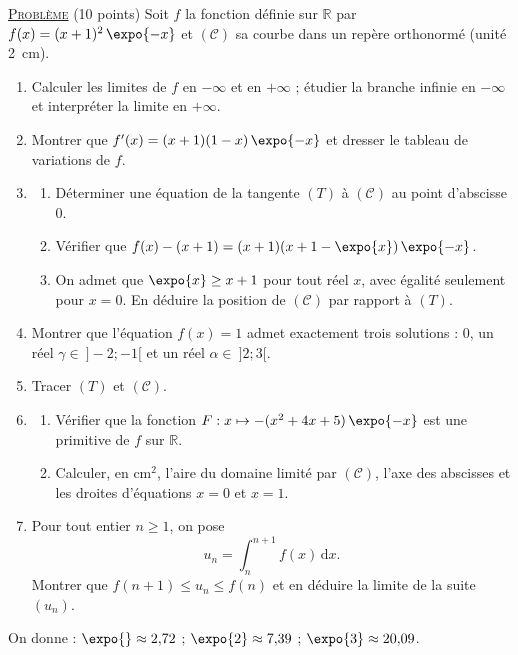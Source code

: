 \noindent \underline{\textsc{Probl\`eme}} (10 points) \newline
Soit $f$ la fonction d\'efinie sur $\mathbb{R}$ par $f(x) = (x+1)^2\,\expo{-x}$ et $(\mathscr{C})$ sa courbe
dans un rep\`ere orthonorm\'e (unit\'e 2~cm).
\begin{enumerate}
      \item Calculer les limites de $f$ en $-\infty$ et en $+\infty$ ; \'etudier la branche infinie en $-\infty$
            et interpr\'eter la limite en $+\infty$.
      \item Montrer que $f'(x) = (x+1)(1-x)\,\expo{-x}$ et dresser le tableau de variations de $f$.
      \item \begin{enumerate}
            \item D\'eterminer une \'equation de la tangente $(T)$ \`a $(\mathscr{C})$ au point d'abscisse $0$.
            \item V\'erifier que $f(x) - (x + 1) = (x+1)(x + 1 - \expo{x})\,\expo{-x}$.
            \item On admet que $\expo{x} \geq x + 1$ pour tout r\'eel $x$, avec \'egalit\'e seulement pour $x = 0$.
                  En d\'eduire la position de $(\mathscr{C})$ par rapport \`a $(T)$.
            \end{enumerate}
      \item Montrer que l'\'equation $f(x) = 1$ admet exactement trois solutions : $0$, un r\'eel $\gamma \in\ ]-2 ; -1[$
            et un r\'eel $\alpha \in\ ]2 ; 3[$.
      \item Tracer $(T)$ et $(\mathscr{C})$.
      \item \begin{enumerate}
            \item V\'erifier que la fonction $F : x \mapsto -(x^2 + 4x + 5)\,\expo{-x}$ est une primitive de $f$ sur $\mathbb{R}$.
            \item Calculer, en cm$^2$, l'aire du domaine limit\'e par $(\mathscr{C})$, l'axe des abscisses et les droites
                  d'\'equations $x = 0$ et $x = 1$.
            \end{enumerate}
      \item Pour tout entier $n \geq 1$, on pose
            \[ u_n = \int_n^{n+1} f(x)\,\mathrm{d}x . \]
            Montrer que $f(n+1) \leq u_n \leq f(n)$ et en d\'eduire la limite de la suite $(u_n)$.
\end{enumerate}
\begin{center}
On donne : $\expo{} \approx 2{,}72$ ; $\expo{2} \approx 7{,}39$ ; $\expo{3} \approx 20{,}09$.
\end{center}

